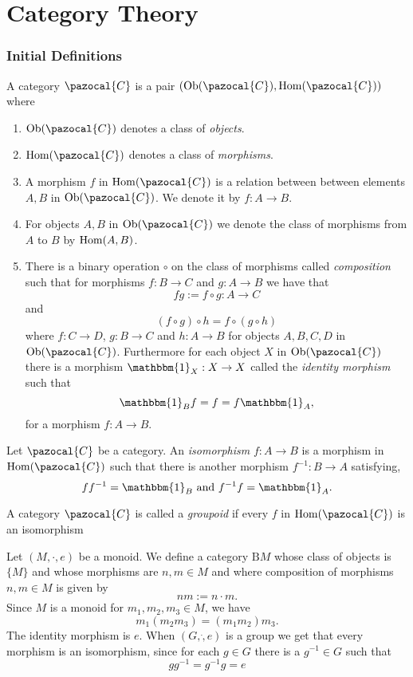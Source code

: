 \section{Category Theory}
\subsubsection{Initial Definitions}
\begin{definition}
    A category $\pazocal{C}$ is a pair $(\Ob(\pazocal{C}),\Hom(\pazocal{C}))$ where 
    \begin{enumerate} 
    \item $\Ob(\pazocal{C})$ denotes a class of \textit{objects}. \item $\Hom(\pazocal{C})$ denotes a class of \textit{morphisms}. 
    \item A morphism $f$ in $\Hom(\pazocal{C})$ is a relation between between elements $A,B$ in $\Ob(\pazocal{C})$. We denote it by $f : A \rightarrow B$. 
    \item For objects $A,B$ in $\Ob(\pazocal{C})$ we denote the class of morphisms from $A$ to $B$ by $\mathrm{Hom}(A,B)$.
    \item There is a binary operation $\circ$ on the class of morphisms called \textit{composition} such that for morphisms $f: B\rightarrow C$ and $g : A \rightarrow B$ we have that
    $$fg := f\circ g : A \rightarrow C$$
    and 
    $$(f\circ g)\circ h = f\circ(g\circ h)$$
    where $f : C \rightarrow D$, $g: B \rightarrow C$ and $h: A \rightarrow B$ for objects $A,B,C,D$ in $\Ob(\pazocal{C})$. Furthermore for each object $X$ in $\Ob(\pazocal{C})$ there is a morphism $\mathbbm{1}_X : X \rightarrow X$ called the \textit{identity morphism} such that 
    $$\mathbbm{1}_B f = f = f \mathbbm{1}_A,$$
    for a morphism $f: A \rightarrow B$.
    \end{enumerate}
\end{definition}
\begin{definition}
    Let $\pazocal{C}$ be a category. An \textit{isomorphism} $f:A \rightarrow B$ is a morphism in $\Hom(\pazocal{C})$ such that there is another morphism $f^{-1} : B\rightarrow A$ satisfying,
    $$ff^{-1} = \mathbbm{1}_B \ \mathrm{ and } \ f^{-1}f = \mathbbm{1}_A.$$
\end{definition}
\begin{definition}
    A category $\pazocal{C}$ is called a \textit{groupoid} if every $f$ in $\Hom(\pazocal{C})$ is an isomorphism
\end{definition}
\begin{example}\label{MonoidIsACategoryGroupIsGroupoid}
    Let $(M,\cdot,e)$ be a monoid. We define a category $\mathrm{B}M$ whose class of objects is $\{M\}$ and whose morphisms are $n,m\in M$ and where composition of morphisms $n,m\in M$ is given by 
    $$nm := n\cdot m.$$  
    Since $M$ is a monoid for $m_1,m_2,m_3\in M$, we have 
    $$m_1(m_2m_3)=(m_1m_2)m_3.$$
    The identity morphism is $e$. When $(G,\dot,e)$ is a group we get that every morphism is an isomorphism, since for each $g\in G$ there is a $g^{-1}\in G$ such that 
    $$gg^{-1}=g^{-1}g = e$$ 
\end{example}
